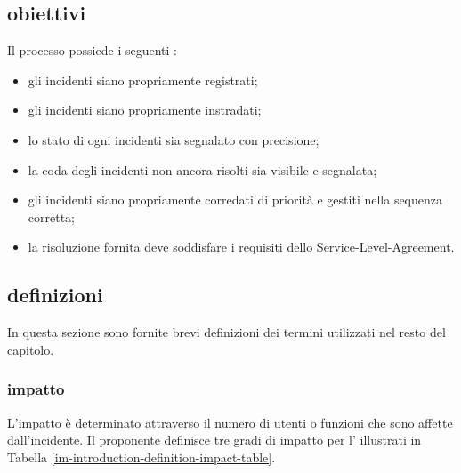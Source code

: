 \subsection[Obiettivi]{obiettivi}
\label{im-introduction-objectives}
Il processo possiede i seguenti :

\begin{itemize}
\item{gli incidenti siano propriamente registrati;}
\item{gli incidenti siano propriamente instradati;}
\item{lo stato di ogni incidenti sia segnalato con precisione;}
\item{la coda degli incidenti non ancora risolti sia visibile e segnalata;}
\item{gli incidenti siano propriamente corredati di priorità e gestiti nella sequenza corretta;}
\item{la risoluzione fornita deve soddisfare i requisiti dello \ac{Service-Level-Agreement}.}
\end{itemize}

\subsection[Definizioni]{definizioni}
\label{im-introduction-definitions}
In questa sezione sono fornite brevi definizioni dei termini utilizzati nel resto del capitolo.

\subsubsection{impatto}
L'impatto è determinato attraverso il numero di utenti o funzioni che sono affette dall'incidente. Il proponente definisce tre gradi di impatto per l'\entity{} illustrati in Tabella \ref{im-introduction-definition-impact-table}.

